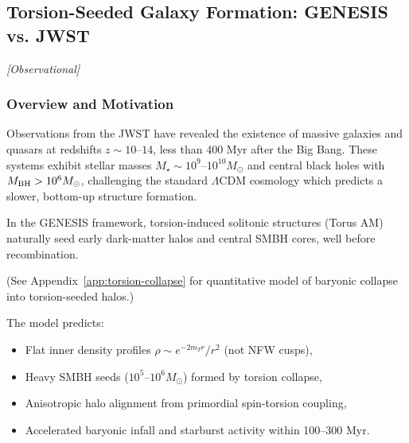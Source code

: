 \documentclass{article}
\newcommand{\obstag}{\textcolor{green!60!black}{\textit{[Observational]}}}
\begin{document}
\medskip
\begin{center}
\end{center}
\medskip




\subsection{Torsion-Seeded Galaxy Formation: GENESIS vs. JWST}
\label{sec:galaxy_formation}
\obstag

\subsubsection{Overview and Motivation}
Observations from the JWST have revealed the existence of massive galaxies and quasars at redshifts $z \sim 10$--$14$, less than 400 Myr after the Big Bang. These systems exhibit stellar masses $M_\star \sim 10^{9}$--$10^{10} M_\odot$ and central black holes with $M_{\rm BH} > 10^6 M_\odot$, challenging the standard $\Lambda$CDM cosmology which predicts a slower, bottom-up structure formation.

In the GENESIS framework, torsion-induced solitonic structures (Torus AM) naturally seed early dark-matter halos and central SMBH cores, well before recombination. 

(See Appendix~\ref{app:torsion-collapse} for quantitative model of baryonic collapse into torsion-seeded halos.)


The model predicts:
\begin{itemize}
  \item Flat inner density profiles $\rho \sim e^{-2m_T r}/r^2$ (not NFW cusps),
  \item Heavy SMBH seeds ($10^5$--$10^6 M_\odot$) formed by torsion collapse,
  \item Anisotropic halo alignment from primordial spin-torsion coupling,
  \item Accelerated baryonic infall and starburst activity within 100--300 Myr.
\end{itemize}
\end{document}
